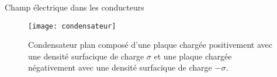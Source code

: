 \begin{corr}{Champ électrique dans les conducteurs}
\begin{figure}[h]
	\centering
	\texttt{[image: condensateur]}
	\caption{Condensateur plan composé d'une plaque chargée positivement avec 
	         une densité surfacique de charge $\sigma$ et une plaque chargée
	 	 négativement avec une densité surfacique de charge $-\sigma$.}%
	\label{fig:condensateur}
\end{figure}
\end{corr}
